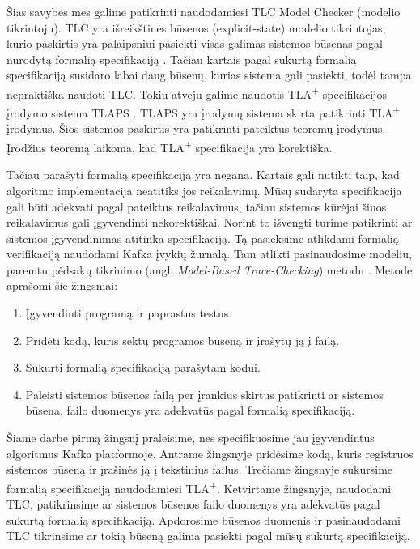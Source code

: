 \documentclass{VUMIFPSmagistrinis}
\begin{document}
	Šias savybes mes galime patikrinti naudodamiesi TLC Model Checker (modelio tikrintoju).
		TLC yra išreikštinės būsenos (explicit-state) modelio tikrintojas, kurio paskirtis yra palaipsniui pasiekti visas galimas sistemos būsenas pagal nurodytą formalią specifikaciją \cite{yu1999model}.
		Tačiau kartais pagal sukurtą formalią specifikaciją susidaro labai daug būsenų, kurias sistema gali pasiekti, todėl tampa nepraktiška naudoti TLC.
		Tokiu atveju galime naudotis TLA\textsuperscript{+} specifikacijos įrodymo sistema TLAPS \cite{cousineau2012tla+}.
		TLAPS yra įrodymų sistema skirta patikrinti TLA\textsuperscript{+} įrodymus.
		Šios sistemos paskirtis yra patikrinti pateiktus teoremų įrodymus.
		Įrodžius teoremą laikoma, kad TLA\textsuperscript{+} specifikacija yra korektiška.


		Tačiau parašyti formalią specifikaciją yra negana.
		Kartais gali nutikti taip, kad algoritmo implementacija neatitiks jos reikalavimų.
		Mūsų sudaryta specifikacija gali būti adekvati pagal pateiktus reikalavimus, tačiau sistemos kūrėjai šiuos reikalavimus gali įgyvendinti nekorektiškai.
		Norint to išvengti turime patikrinti ar sistemos įgyvendinimas atitinka specifikaciją.
		Tą pasieksime atlikdami formalią verifikaciją naudodami Kafka įvykių žurnalą.
		Tam atlikti pasinaudosime modeliu, paremtu pėdsakų tikrinimo (angl. {\it Model-Based Trace-Checking}) metodu \cite{ltx}.
		Metode aprašomi šie žingsniai:
		\begin{enumerate}
			\item{Įgyvendinti programą ir paprastus testus.}
			\item{Pridėti kodą, kuris sektų programos būseną ir įrašytų ją į failą.}
			\item{Sukurti formalią specifikaciją parašytam kodui.}
			\item{Paleisti sistemos būsenos failą per įrankius skirtus patikrinti ar sistemos būsena, failo duomenys yra adekvatūs pagal formalią specifikaciją.}
		\end{enumerate}

		Šiame darbe pirmą žingsnį praleisime, nes specifikuosime jau įgyvendintus algoritmus Kafka platformoje.
		Antrame žingsnyje pridėsime kodą, kuris registruos sistemos būseną ir įrašinės ją į tekstinius failus.
		Trečiame žingsnyje sukursime formalią specifikaciją naudodamiesi TLA\textsuperscript{+}.
		Ketvirtame žingsnyje, naudodami TLC, patikrinsime ar sistemos būsenos failo duomenys yra adekvatūs pagal sukurtą formalią specifikaciją. Apdorosime būsenos duomenis ir pasinaudodami TLC tikrinsime ar tokią būseną galima pasiekti pagal mūsų sukurtą specifikaciją.
\end{document}
